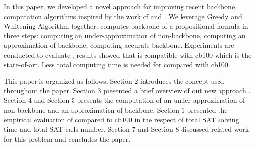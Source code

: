 In this paper, we developed a novel approach \tool for improving recent backbone computation algorithms inspired by the work of \cite{Z11} and \cite{JLM15}. We leverage Greedy and Whitening Algorithm together, computes backbone of a propositional formula in three steps: computing an under-approximation of non-backbone, computing an approximation of backbone, computing accurate backbone. Experiments are conducted to evaluate \tool, results showed that \tool is compatible with cb100 which is the state-of-art. Less total computing time is needed for \tool compared with cb100.


This paper is organized as follows.
Section 2 introduces the concept used throughout the paper.
Section 3 presented a brief overview of out new approach \tool.
Section 4 and Section 5 presents the computation of an under-approximation of non-backbone and an approximation of backbone.
Section 6 presented the empirical evaluation of \tool compared to cb100 in the respect of total SAT solving time and total SAT calls number.
Section 7 and Section 8 discussed related work for this problem and concludes the paper.
